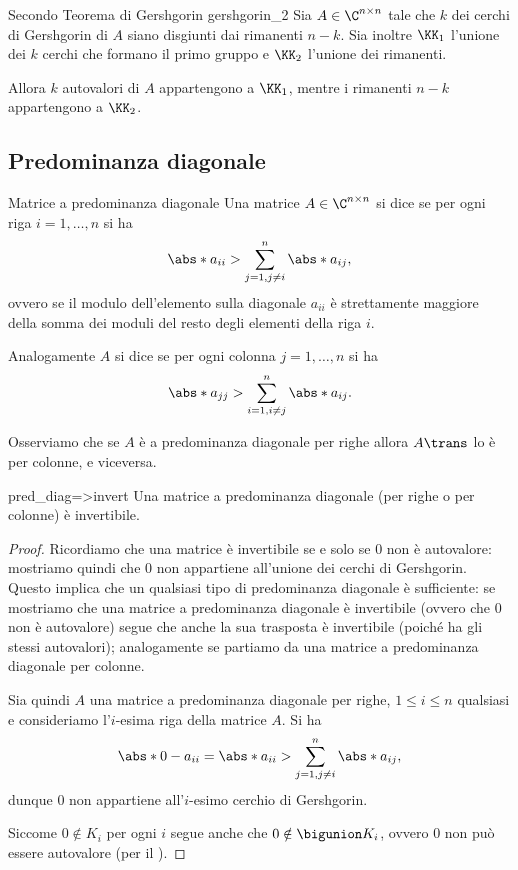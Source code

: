 \begin{theorem}
    {Secondo Teorema di Gershgorin}
    {gershgorin_2}
    Sia $A \in \Mat{\C, n, n}$ tale che $k$ dei cerchi di Gershgorin di $A$ siano disgiunti dai rimanenti $n-k$. Sia inoltre $\KK_1$ l'unione dei $k$ cerchi che formano il primo gruppo e $\KK_2$ l'unione dei rimanenti.

    Allora $k$ autovalori di $A$ appartengono a $\KK_1$, mentre i rimanenti $n-k$ appartengono a $\KK_2$. 
\end{theorem}

\subsection{Predominanza diagonale}

\begin{definition}
    {Matrice a predominanza diagonale}
    Una matrice $A \in \Mat{\C, n, n}$ si dice  se per ogni riga $i = 1, \dots, n$ si ha \[
        \abs*{a_{ii}} > \sum_{j=1, j\neq i}^n \abs*{a_{ij}},
    \] ovvero se il modulo dell'elemento sulla diagonale $a_{ii}$ è strettamente maggiore della somma dei moduli del resto degli elementi della riga $i$.

    Analogamente $A$ si dice  se per ogni colonna $j = 1, \dots, n$ si ha \[
        \abs*{a_{jj}} > \sum_{i=1, i\neq j}^n \abs*{a_{ij}}.
    \] 
\end{definition}

Osserviamo che se $A$ è a predominanza diagonale per righe allora $A\trans$ lo è per colonne, e viceversa.

\begin{proposition}{}{pred_diag=>invert}
    Una matrice a predominanza diagonale (per righe o per colonne) è invertibile.
\end{proposition}
\begin{proof}
    Ricordiamo che una matrice è invertibile se e solo se $0$ non è autovalore: mostriamo quindi che $0$ non appartiene all'unione dei cerchi di Gershgorin.
    Questo implica che un qualsiasi tipo di predominanza diagonale è sufficiente: se mostriamo che una matrice a predominanza diagonale è invertibile (ovvero che $0$ non è autovalore) segue che anche la sua trasposta è invertibile (poiché ha gli stessi autovalori); analogamente se partiamo da una matrice a predominanza diagonale per colonne.

    Sia quindi $A$ una matrice a predominanza diagonale per righe, $1 \leq i \leq n$ qualsiasi e consideriamo l'$i$-esima riga della matrice $A$. Si ha \[
        \abs*{0 - a_{ii}} = \abs*{a_{ii}} > \sum_{j=1, j\neq i}^n \abs*{a_{ij}},
    \] dunque $0$ non appartiene all'$i$-esimo cerchio di Gershgorin.

    Siccome $0 \notin K_i$ per ogni $i$ segue anche che $0 \notin \bigunion K_i$, ovvero $0$ non può essere autovalore (per il ).
\end{proof}